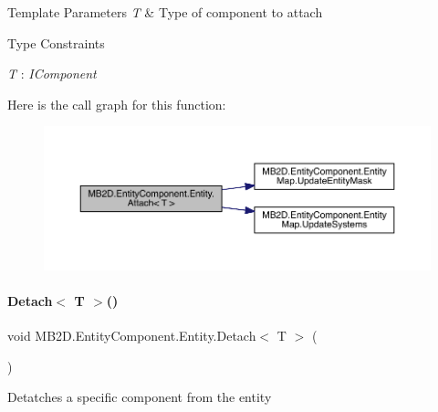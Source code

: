 \begin{DoxyTemplParams}{Template Parameters}
{\em T} & Type of component to attach\\
\hline
\end{DoxyTemplParams}
\begin{Desc}
\item[Type Constraints]\begin{description}
\item[{\em T} : {\em I\+Component}]\end{description}
\end{Desc}
Here is the call graph for this function\+:
\nopagebreak
\begin{figure}[H]
\begin{center}
\leavevmode
\includegraphics[width=350pt]{class_m_b2_d_1_1_entity_component_1_1_entity_a53ffea8d43423903712540fc2df6b82d_cgraph}
\end{center}
\end{figure}
\hypertarget{class_m_b2_d_1_1_entity_component_1_1_entity_a9194f3b1f3370d2ecb47efe077ba4050}{}\label{class_m_b2_d_1_1_entity_component_1_1_entity_a9194f3b1f3370d2ecb47efe077ba4050} 
\paragraph{\texorpdfstring{Detach$<$ T $>$()}{Detach< T >()}}
{\footnotesize\ttfamily void M\+B2\+D.\+Entity\+Component.\+Entity.\+Detach$<$ T $>$ (\begin{DoxyParamCaption}{ }\end{DoxyParamCaption})\hspace{0.3cm}{\ttfamily [inline]}}



Detatches a specific component from the entity 


